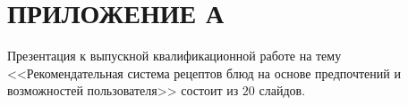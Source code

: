 \chapter*{ПРИЛОЖЕНИЕ А}
Презентация к выпускной квалификационной работе на тему <<Рекомендательная система рецептов блюд на основе предпочтений и возможностей пользователя>> состоит из $20$ слайдов.